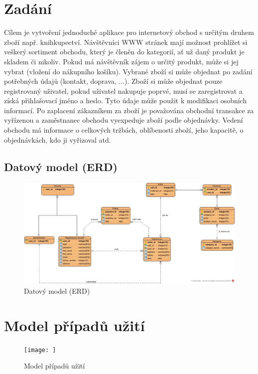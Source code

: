 \documentclass[11pt, a4paper]{article}
\begin{document}
\section{Zadání}
Cílem je vytvoření jednoduché aplikace pro internetový obchod s určitým druhem zboží např. knihkupectví. Návštěvníci WWW stránek mají možnost prohlížet si veškerý sortiment obchodu, který je členěn do kategorií, ať už daný produkt je skladem či nikoliv. Pokud má návštěvník zájem o určitý produkt, může si jej vybrat (vložení do nákupního košíku). Vybrané zboží si může objednat po zadání potřebných údajů (kontakt, doprava, ...). Zboží si může objednat pouze registrovaný uživatel, pokud uživatel nakupuje poprvé, musí se zaregistrovat a získá přihlašovací jméno a heslo. Tyto údaje může použit k modifikaci osobních informací. Po zaplacení zákazníkem za zboží je považována obchodní transakce za vyřízenou a zaměstnanec obchodu vyexpeduje zboží podle objednávky. Vedení obchodu má informace o celkových tržbách, oblíbenosti zboží, jeho kapacitě, o objednávkách, kdo ji vyřizoval atd.
\newpage
\begin{landscape}
\section{Datový model (ERD)}
 \begin{figure}[!ht]
    \centering
    \includegraphics[width=1\linewidth]{IDS - project_1.jpg}
    \caption{Datový model (ERD)}
    \label{figure:ast_example1}
\end{figure}

\end{landscape}

\newpage
\section{Model případů užití}
 \begin{figure}[!ht]
    \centering
    \texttt{[image: ]}
    \caption{Model případů užití}
    \label{figure:ast_example1}
\end{figure}
\end{document}

